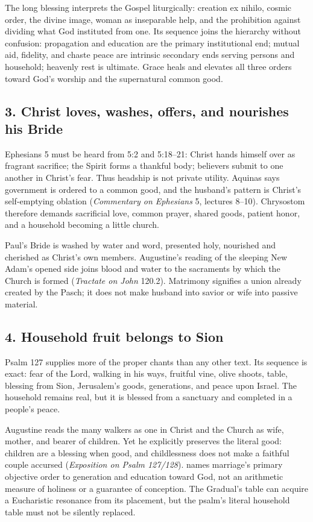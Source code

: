 \begin{deepstudy}
The long blessing interprets the Gospel liturgically: creation ex nihilo, cosmic order, the divine image, woman as inseparable help, and the prohibition against dividing what God instituted from one. Its sequence joins the hierarchy without confusion: propagation and education are the primary institutional end; mutual aid, fidelity, and chaste peace are intrinsic secondary ends serving persons and household; heavenly rest is ultimate. Grace heals and elevates all three orders toward God's worship and the supernatural common good.

\subsection*{3. Christ loves, washes, offers, and nourishes his Bride\enspace{}}

Ephesians 5 must be heard from 5:2 and 5:18--21: Christ hands himself over as fragrant sacrifice; the Spirit forms a thankful body; believers submit to one another in Christ's fear. Thus headship is not private utility. Aquinas says government is ordered to a common good, and the husband's pattern is Christ's self-emptying oblation (\emph{Commentary on Ephesians} 5, lectures 8--10). Chrysostom therefore demands sacrificial love, common prayer, shared goods, patient honor, and a household becoming a little church.

Paul's Bride is washed by water and word, presented holy, nourished and cherished as Christ's own members. Augustine's reading of the sleeping New Adam's opened side joins blood and water to the sacraments by which the Church is formed (\emph{Tractate on John} 120.2). Matrimony signifies a union already created by the Pasch; it does not make husband into savior or wife into passive material.

\newpage
\subsection*{4. Household fruit belongs to Sion\enspace{}}

Psalm 127 supplies more of the proper chants than any other text. Its sequence is exact: fear of the Lord, walking in his ways, fruitful vine, olive shoots, table, blessing from Sion, Jerusalem's goods, generations, and peace upon Israel. The household remains real, but it is blessed from a sanctuary and completed in a people's peace.

Augustine reads the many walkers as one in Christ and the Church as wife, mother, and bearer of children. Yet he explicitly preserves the literal good: children are a blessing when good, and childlessness does not make a faithful couple accursed (\emph{Exposition on Psalm 127/128}).  names marriage's primary objective order to generation and education toward God, not an arithmetic measure of holiness or a guarantee of conception. The Gradual's table can acquire a Eucharistic resonance from its placement, but the psalm's literal household table must not be silently replaced.


\end{deepstudy}
